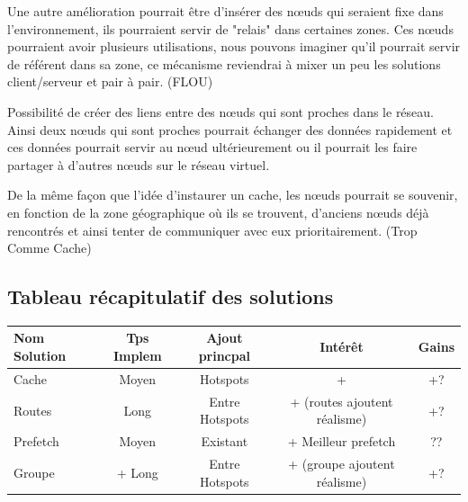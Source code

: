 \par Une autre amélioration pourrait être d'insérer des nœuds qui seraient fixe dans l'environnement, ils pourraient servir de "relais" dans certaines zones. Ces nœuds pourraient avoir plusieurs utilisations, nous pouvons imaginer qu'il pourrait servir de référent dans sa zone, ce mécanisme reviendrai à mixer un peu les solutions client/serveur et pair à pair. (FLOU)

\par Possibilité de créer des liens entre des nœuds qui sont proches dans le réseau. Ainsi deux nœuds qui sont proches pourrait échanger des données rapidement et ces données pourrait servir au nœud ultérieurement ou il pourrait les faire partager à d'autres nœuds sur le réseau virtuel. 
 
\par De la même façon que l'idée d'instaurer un cache, les nœuds pourrait se souvenir, en fonction de la zone géographique où ils se trouvent, d'anciens nœuds déjà rencontrés et ainsi tenter de communiquer avec eux prioritairement. (Trop Comme Cache)



\subsection{Tableau récapitulatif des solutions}

\vspace{1cm}
\begin{tabular}{|l|c|c|c|c|}
\hline
Nom Solution & Tps Implem & Ajout princpal & Intérêt & Gains \\
\hline
Cache & Moyen & Hotspots & + & +? \\
Routes & Long & Entre Hotspots & + (routes ajoutent réalisme) & +?\\
Prefetch & Moyen & Existant & + Meilleur prefetch & ??\\
Groupe & + Long & Entre Hotspots & + (groupe ajoutent réalisme) & +?\\
\hline
\end{tabular}
\vspace{1cm}

